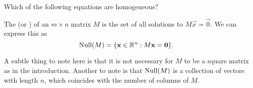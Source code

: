 \documentclass{ximera}
\begin{document}
\begin{question}
  Which of the following equations are homogeneous?
  \begin{selectAll}
  \end{selectAll}
\end{question}

\begin{definition}
  The  (or ) of an $m \times n$ matrix $M$ is
  the set of all solutions to $M\vec{x} = \vec{0}$. We can express
  this as
  \[
    \operatorname{Null}(M) = \{ \mathbf{x}\in\mathbb{R}^n: M\mathbf{x} = \mathbf{0}\}.
  \]
\end{definition}

\begin{remark}
  A subtle thing to note here is that it is not necessary for $M$ to be
  a square matrix as in the introduction. Another to note is that
  $\operatorname{Null}(M)$ is a collection of vectors with length $n$, which coincides
  with the number of columns of $M$.
\end{remark}
\end{document}
